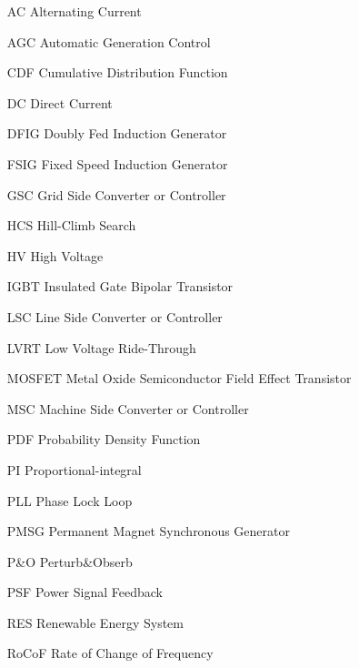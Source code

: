 \begin{glossary}{}

\begin{itemize}[leftmargin=4.5em,align=parleft,labelsep=1cm]
	
\item[AC] Alternating Current
\item[AGC] Automatic Generation Control
\item[CDF] Cumulative Distribution Function
\item[DC] Direct Current
\item[DFIG] Doubly Fed Induction Generator
\item[FSIG] Fixed Speed Induction Generator
\item[GSC] Grid Side Converter or Controller
\item[HCS] Hill-Climb Search
\item[HV] High Voltage
\item[IGBT] Insulated Gate Bipolar Transistor
\item[LSC] Line Side Converter or Controller
\item[LVRT] Low Voltage Ride-Through
\item[MOSFET] Metal Oxide Semiconductor Field Effect Transistor
\item[MSC] Machine Side Converter or Controller
\item[PDF] Probability Density Function
\item[PI] Proportional-integral
\item[PLL] Phase Lock Loop
\item[PMSG] Permanent Magnet Synchronous Generator
\item[P\&O] Perturb\&Obserb
\item[PSF] Power Signal Feedback
\item[RES] Renewable Energy System
\item[RoCoF] Rate of Change of Frequency

\end{itemize}

\end{glossary}

